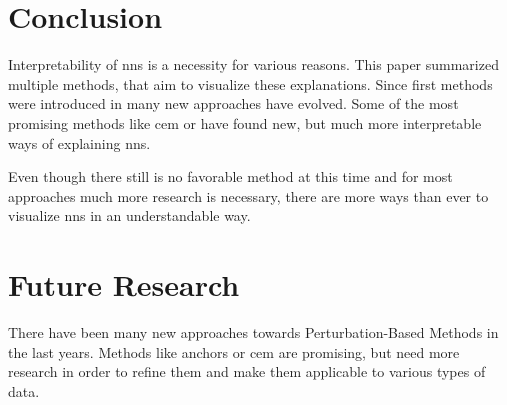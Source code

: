 \section{Conclusion}
Interpretability of \glspl{nn} is a necessity for various reasons. This paper summarized multiple methods, that aim to visualize these explanations. Since first methods were introduced in \cite{RobnikSikonja.2008} many new approaches have evolved. Some of the most promising methods like \gls{cem} or  have found new, but much more interpretable ways of explaining \glspl{nn}. 
\par
Even though there still is no favorable method at this time and for most approaches much more research is necessary, there are more ways than ever to visualize \glspl{nn} in an understandable way.

\section{Future Research}
There have been many new approaches towards Perturbation-Based Methods in the last years. Methods like anchors or \gls{cem} are promising, but need more research in order to refine them and make them applicable to various types of data. 
